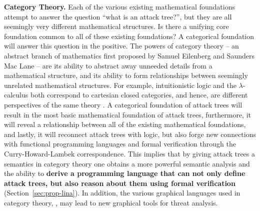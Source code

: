 \documentclass{llncs}
\begin{document}
\textbf{Category Theory.}  Each of the various existing mathematical
foundations attempt to answer the question ``what is an attack
tree?'', but they are all seemingly very different mathematical
structures.  Is there a unifying core foundation common to all of
these existing foundations? A categorical foundation will answer this
question in the positive. The powers of category theory -- an abstract
branch of mathematics first proposed by Samuel Eilenberg and Saunders
Mac Lane \cite{MacLane:1971} -- are its ability to abstract away
unneeded details from a mathematical structure, and its ability to
form relationships between seemingly unrelated mathematical
structures.  For example, intuitionistic logic and the
$\lambda$-calculus both correspond to cartesian closed categories, and
hence, are different perspectives of the same theory
\cite{Lambek:1980}.  A categorical foundation of attack trees will
result in the most basic mathematical foundation of attack trees,
furthermore, it will reveal a relationship between all of the existing
mathematical foundations, and lastly, it will reconnect attack trees
with logic, but also forge new connections with functional programming
languages and formal verification through the Curry-Howard-Lambek
correspondence.  This implies that by giving attack trees a semantics
in category theory one obtains a more powerful semantic analysis and
the ability to \textbf{derive a programming language that can not only
  define attack trees, but also reason about them using formal
  verification} (Section~\ref{sec:prop-lina}).  In addition, the
various graphical languages used in category theory,
\cite{Selinger:2009}, may lead to new graphical tools for threat
analysis.
\end{document}
